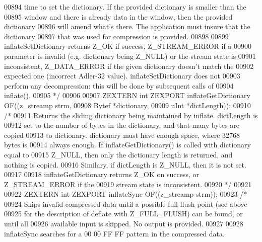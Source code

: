 \begin{DoxyCode}
00894 \textcolor{comment}{   time to set the dictionary.  If the provided dictionary is smaller than the}
00895 \textcolor{comment}{   window and there is already data in the window, then the provided dictionary}
00896 \textcolor{comment}{   will amend what's there.  The application must insure that the dictionary}
00897 \textcolor{comment}{   that was used for compression is provided.}
00898 \textcolor{comment}{}
00899 \textcolor{comment}{     inflateSetDictionary returns Z\_OK if success, Z\_STREAM\_ERROR if a}
00900 \textcolor{comment}{   parameter is invalid (e.g.  dictionary being Z\_NULL) or the stream state is}
00901 \textcolor{comment}{   inconsistent, Z\_DATA\_ERROR if the given dictionary doesn't match the}
00902 \textcolor{comment}{   expected one (incorrect Adler-32 value).  inflateSetDictionary does not}
00903 \textcolor{comment}{   perform any decompression: this will be done by subsequent calls of}
00904 \textcolor{comment}{   inflate().}
00905 \textcolor{comment}{*/}
00906 
00907 ZEXTERN \textcolor{keywordtype}{int} ZEXPORT inflateGetDictionary OF((z\_streamp strm,
00908                                              Bytef *dictionary,
00909                                              uInt  *dictLength));
00910 \textcolor{comment}{/*}
00911 \textcolor{comment}{     Returns the sliding dictionary being maintained by inflate.  dictLength is}
00912 \textcolor{comment}{   set to the number of bytes in the dictionary, and that many bytes are copied}
00913 \textcolor{comment}{   to dictionary.  dictionary must have enough space, where 32768 bytes is}
00914 \textcolor{comment}{   always enough.  If inflateGetDictionary() is called with dictionary equal to}
00915 \textcolor{comment}{   Z\_NULL, then only the dictionary length is returned, and nothing is copied.}
00916 \textcolor{comment}{   Similary, if dictLength is Z\_NULL, then it is not set.}
00917 \textcolor{comment}{}
00918 \textcolor{comment}{     inflateGetDictionary returns Z\_OK on success, or Z\_STREAM\_ERROR if the}
00919 \textcolor{comment}{   stream state is inconsistent.}
00920 \textcolor{comment}{*/}
00921 
00922 ZEXTERN \textcolor{keywordtype}{int} ZEXPORT inflateSync OF((z\_streamp strm));
00923 \textcolor{comment}{/*}
00924 \textcolor{comment}{     Skips invalid compressed data until a possible full flush point (see above}
00925 \textcolor{comment}{   for the description of deflate with Z\_FULL\_FLUSH) can be found, or until all}
00926 \textcolor{comment}{   available input is skipped.  No output is provided.}
00927 \textcolor{comment}{}
00928 \textcolor{comment}{     inflateSync searches for a 00 00 FF FF pattern in the compressed data.}

\end{DoxyCode}
